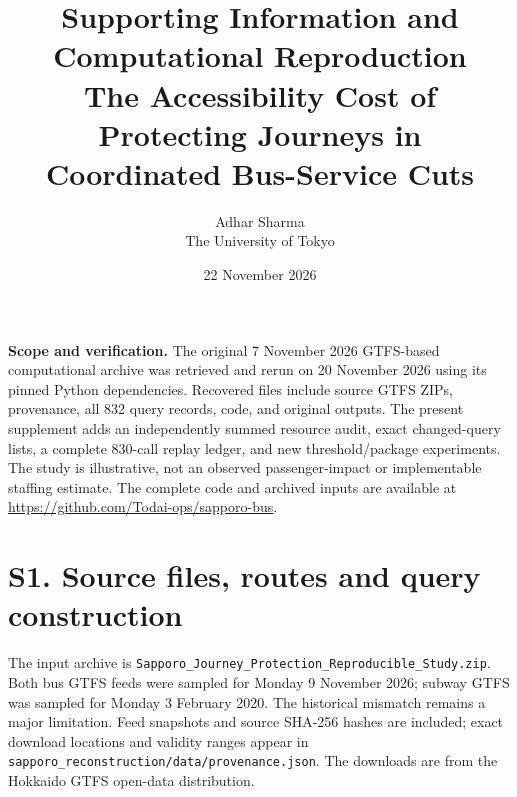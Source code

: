 \documentclass[10pt]{article}
\title{Supporting Information and Computational Reproduction\\\large The Accessibility Cost of Protecting Journeys in Coordinated Bus-Service Cuts}
\author{Adhar Sharma\\The University of Tokyo}
\date{22 November 2026}
\newcommand{\st}[1]{\texttt{\footnotesize #1}}
\begin{document}
\maketitle
\textbf{Scope and verification.} The original 7 November 2026 GTFS-based computational archive was retrieved and rerun on 20 November 2026 using its pinned Python dependencies. Recovered files include source GTFS ZIPs, provenance, all 832 query records, code, and original outputs. The present supplement adds an independently summed resource audit, exact changed-query lists, a complete 830-call replay ledger, and new threshold/package experiments. The study is illustrative, not an observed passenger-impact or implementable staffing estimate. The complete code and archived inputs are available at \url{https://github.com/Todai-ops/sapporo-bus}.

\section*{S1. Source files, routes and query construction}
The input archive is \st{Sapporo\_Journey\_Protection\_Reproducible\_Study.zip}. Both bus GTFS feeds were sampled for Monday 9 November 2026; subway GTFS was sampled for Monday 3 February 2020. The historical mismatch remains a major limitation. Feed snapshots and source SHA-256 hashes are included; exact download locations and validity ranges appear in \st{sapporo\_reconstruction/data/provenance.json}. The downloads are from the Hokkaido GTFS open-data distribution.
\end{document}
